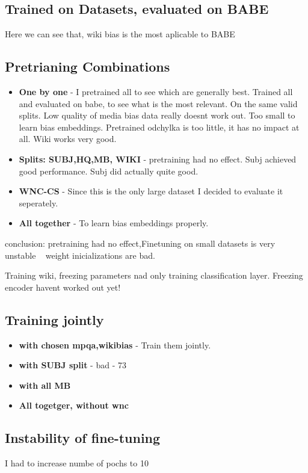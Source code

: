  \subsection{Trained on Datasets, evaluated on BABE}
 Here we can see that, wiki bias is the most aplicable to BABE
 
 \subsection{Pretrianing Combinations}
 \begin{itemize}
     \item \textbf{One by one} -  I pretrained all to see which are generally best. Trained all and evaluated on babe, to see what is the most relevant. On the same valid splits. Low quality of media bias data really doesnt work out. Too small to learn bias embeddings.
     Pretrained odchylka is too little, it has no impact at all. Wiki works very good.
     \item \textbf{Splits: SUBJ,HQ,MB, WIKI} - pretraining had no effect. Subj achieved good performance. Subj did actually quite good.
     \item \textbf{WNC-CS} - Since this is the only large dataset I decided to evaluate it seperately.
     \item \textbf{All together} - To learn bias embeddings properly.
 \end{itemize}
 conclusion: pretraining had no effect,Finetuning on small datasets is very unstable ~ weight inicializations are bad.
 
 Training wiki, freezing parameters nad only training classification layer.
 Freezing encoder havent worked out yet!
\subsection{Training jointly}
\begin{itemize}
    \item \textbf{with chosen mpqa,wikibias} - Train them jointly.
    \item \textbf{with SUBJ split} - bad - 73
    \item \textbf{with all MB}
    \item \textbf{All togetger, without wnc}
\end{itemize}

\subsection{Instability of fine-tuning}
I had to increase numbe of pochs to 10
